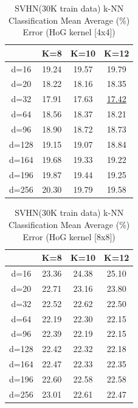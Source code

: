 \begin{table}[H]
\centering
\label{tab:table12}
\begin{tabular}{|c|c|c|c|}
\hline
 & K=8 & K=10 & K=12 \\
\hline
d=16 & 19.24 & 19.57 & 19.79 \\
d=20 & 18.22 & 18.16 & 18.35 \\
d=32 & 17.91 & 17.63 & \underline{17.42} \\
d=64 & 18.56 & 18.37 & 18.21 \\
d=96 & 18.90 & 18.72 & 18.73 \\
d=128 & 19.15 & 19.07 & 18.84 \\
d=164 & 19.68 & 19.33 & 19.22 \\
d=196 & 19.87 & 19.44 & 19.25 \\
d=256 & 20.30 & 19.79 & 19.58 \\
\hline
\end{tabular}
\caption{SVHN(30K train data) k-NN Classification Mean Average (\%) Error (HoG kernel [4x4])}
\end{table}

\begin{table}[H]
\centering
\label{tab:table13}
\begin{tabular}{|c|c|c|c|}
\hline
 & K=8 & K=10 & K=12 \\
\hline
d=16 & 23.36 & 24.38 & 25.10 \\
d=20 & 22.71 & 23.16 & 23.80 \\
d=32 & 22.52 & 22.62 & 22.50 \\
d=64 & 22.19 & 22.30 & 22.15 \\
d=96 & 22.39 & 22.19 & 22.15 \\
d=128 & 22.42 & 22.32 & 22.18 \\
d=164 & 22.47 & 22.33 & 22.35 \\
d=196 & 22.60 & 22.58 & 22.58 \\
d=256 & 23.01 & 22.61 & 22.47 \\
\hline
\end{tabular}
\caption{SVHN(30K train data) k-NN Classification Mean Average (\%) Error (HoG kernel [8x8])}
\end{table}


